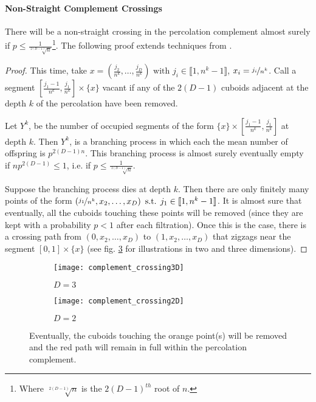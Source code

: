 
\paragraph{Non-Straight Complement Crossings}
There will be a non-straight crossing in the percolation complement almost surely if $p \leq \frac{1}{\sqrt[2(D-1)]{n}}$\footnote{Where $\sqrt[2(D-1)]{n}$ is the $2(D-1)^{th}$ root of $n$.}.
The following proof extends techniques from \cite[p.310 b.(2)]{Chayes_1988}.
\begin{proof}\label{prf:nonStraightComplementCrossigs}
	This time, take $x = \left( \frac{j_2}{n^k},\dots,\frac{j_D}{n^k} \right) \text{ with } j_i \in \llbracket 1,n^k-1 \rrbracket$, $x_i = \nicefrac{j_i}{n^k}$.
	Call a segment $\left[ \frac{j_1-1}{n^k},\frac{j_1}{n^k} \right] \times \{ x \}$ vacant if any of the $2(D-1)$ cuboids adjacent at the depth $k$ of the percolation have been removed.
	
	Let $Y^k$, be the number of occupied segments of the form $\{ x \} \times \left[ \frac{j_1-1}{n^k},\frac{j_1}{n^k} \right]$ at depth $k$.
	Then $Y^k$, is a branching process in which each the mean number of offspring is $p^{2(D-1)n}$.
	This branching process is almost surely eventually empty if $np^{2(D-1)} \leq 1$, i.e. if $p \leq \frac{1}{\sqrt[2(D-1)]{n}}$.
	
	Suppose the branching process dies at depth $k$.
	Then there are only finitely many points of the form $\left( \nicefrac{j_1}{n^k}, x_2,\dots,x_D \right) \text{ s.t. } j_1 \in \llbracket 1,n^k-1 \rrbracket$.
	It is almost sure that eventually, all the cuboids touching these points will be removed (since they are kept with a probability $p<1$ after each filtration).
	Once this is the case, there is a crossing path from $\left( 0, x_2,\dots,x_D \right)$ to $\left( 1, x_2,\dots,x_D \right)$ that zigzags near the segment $\left[ 0,1 \right] \times \{ x \}$ (see fig. \ref{fig:complementCrossing} for illustrations in two and three dimensions).
\end{proof}

\begin{figure}[!h]
	\vspace{-0.75cm}
	\begin{subfigure}{0.44\linewidth}
		\texttt{[image: complement\_crossing3D]}
		\centering
		\captionsetup{justification=centering}
		\caption{$D = 3$}
		\label{fig:complementCrossing3D}
	\end{subfigure}
	\hspace{0.1\linewidth}
	\begin{subfigure}{0.44\linewidth}
		\texttt{[image: complement\_crossing2D]}
		\centering
		\captionsetup{justification=centering}
		\caption{$D = 2$}
		\label{fig:complementCrossing2D}
	\end{subfigure}
	\centering
	\caption{Eventually, the cuboids touching the orange point(s) will be removed and the red path will remain in full within the percolation complement.}
	\label{fig:complementCrossing}
\end{figure}

